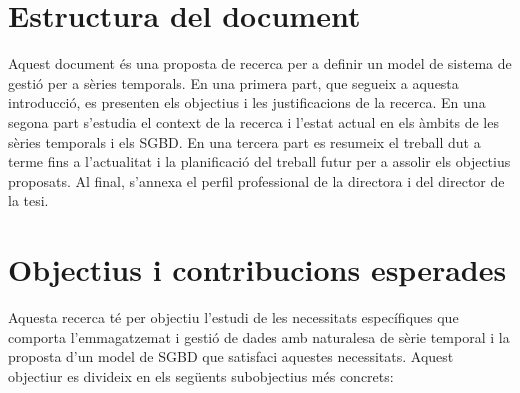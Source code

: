\section{Estructura del document}

Aquest document és una proposta de recerca per a definir un model de
sistema de gestió per a sèries temporals. En una primera part, que
segueix a aquesta introducció, es presenten els objectius i les
justificacions de la recerca. En una segona part s'estudia el context
de la recerca i l'estat actual en els àmbits de les sèries temporals i
els SGBD. En una tercera part es resumeix el treball dut a terme fins
a l'actualitat i la planificació del treball futur per a assolir els
objectius proposats. Al final, s'annexa el perfil professional de la
directora i del director de la tesi.




\section{Objectius i contribucions esperades}
\label{sec:objectius}

Aquesta recerca té per objectiu l'estudi de les necessitats
específiques que comporta l'emmagatzemat i gestió de dades amb
naturalesa de sèrie temporal i la proposta d'un model de SGBD que
satisfaci aquestes necessitats. Aquest objectiur es divideix en els
següents subobjectius més concrets:

